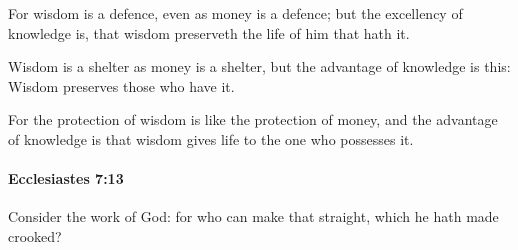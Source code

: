 			\begin{versebox}
					\item[BHS] 
					\item[LXX] 
					\item[ASV] For wisdom is a defence, even as money is a defence; but the excellency of knowledge is, that wisdom preserveth the life of him that hath it.
					\item[NIV] Wisdom is a shelter as money is a shelter, but the advantage of knowledge is this: Wisdom preserves those who have it.
					\item[NRSV] For the protection of wisdom is like the protection of money, and the advantage of knowledge is that wisdom gives life to the one who possesses it.
			\end{versebox}

		\paragraph{Ecclesiastes 7:13} %
			\label{ECCLESIASTES-7-13}

			Consider the work of God: for who can make that straight, which he hath made crooked?

